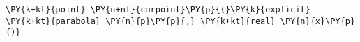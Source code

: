 \begin{Verbatim}[commandchars=\\\{\}]
    \PY{k+kt}{point} \PY{n+nf}{curpoint}\PY{p}{(}\PY{k}{explicit} \PY{k+kt}{parabola} \PY{n}{p}\PY{p}{,} \PY{k+kt}{real} \PY{n}{x}\PY{p}{)}
\end{Verbatim}
